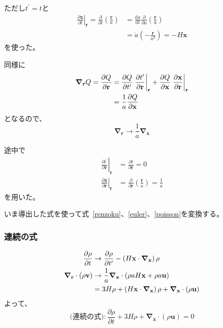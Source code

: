 \documentclass[a4paper,papersize,uplatex,dvipdfmx,10pt]{jsarticle}
\begin{document}
ただし$t^{\prime}=t$と
\begin{align*}
  \left.\frac{\partial \mathbf{x}}{\partial t}\right|_{\mathbf{r}} = \frac{\partial}{\partial t}\left( \frac{\mathbf{r}}{a} \right) &= \frac{\mathrm{d}a}{\mathrm{d}t}\frac{\partial}{\partial a}\left( \frac{\mathbf{r}}{a} \right)\\
  &= \dot{a}\left( -\frac{\mathbf{r}}{a^{2}} \right) = -H\mathbf{x}
\end{align*}
を使った。

同様に
\begin{align}
  \bm{\nabla}_{\mathbf{r}}Q = \frac{\partial Q}{\partial \mathbf{r}} &= \frac{\partial Q}{\partial t^{\prime}}\left.\frac{\partial t^{\prime}}{\partial \mathbf{r}} \right|_{\mathbf{r}} + \frac{\partial Q}{\partial \mathbf{x}}\left.\frac{\partial \mathbf{x}}{\partial \mathbf{r}}\right|_{\mathbf{r}}\notag\\
  &= \frac{1}{a}\frac{\partial Q}{\partial \mathbf{x}}
\end{align}
となるので、
\begin{equation}
  \bm{\nabla}_{\mathbf{r}} \to \frac{1}{a}\bm{\nabla}_{\mathbf{x}}
\end{equation}

途中で
\begin{align*}
  \left.\frac{\partial t^{\prime}}{\partial \mathbf{r}} \right|_{\mathbf{r}} &= \frac{\partial t}{\partial \mathbf{r}} = 0\\
  \left.\frac{\partial \mathbf{x}}{\partial \mathbf{r}}\right|_{\mathbf{r}} &= \frac{\partial}{\partial \mathbf{r}}\left( \frac{\mathbf{r}}{a} \right) = \frac{1}{a}
\end{align*}
を用いた。

いま導出した式を使って式~\eqref{renzoku}、\eqref{euler}、\eqref{poisson}を変換する。
\subsubsection{連続の式}
\begin{align}
  \frac{\partial \rho}{\partial t} &\to \frac{\partial \rho}{\partial t^{\prime}} - \left( H\mathbf{x}\cdot\bm{\nabla}_{\mathbf{x}}\right)\rho\\
  \bm{\nabla}_{\mathbf{r}}\cdot\left( \rho \mathbf{v} \right) &\to \frac{1}{a}\bm{\nabla}_{\mathbf{x}}\cdot\left( \rho aH\mathbf{x} + \rho a\mathbf{u} \right)\notag\\
  &= 3H\rho + \left( H\mathbf{x}\cdot\bm{\nabla}_{\mathbf{x}}\right)\rho + \bm{\nabla}_{\mathbf{x}} \cdot \left( \rho\mathbf{u} \right)
\end{align}
よって、
\begin{equation}
  \text{(連続の式)}: \frac{\partial \rho}{\partial t} + 3H\rho + \bm{\nabla}_{\mathbf{x}} \cdot \left( \rho\mathbf{u} \right) = 0
\end{equation}
\end{document}
